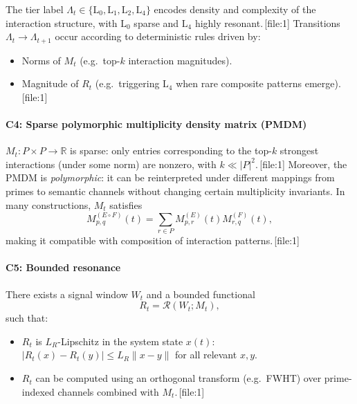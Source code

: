 \documentclass[11pt]{article}
\begin{document}
\begin{description}[leftmargin=1.5em]
\item[C3.] The tier label $\Lambda_t \in \{\mathrm{L}_0, \mathrm{L}_1, \mathrm{L}_2, \mathrm{L}_4\}$ encodes density and complexity of the interaction structure, with $\mathrm{L}_0$ sparse and $\mathrm{L}_4$ highly resonant.\,[file:1]
Transitions $\Lambda_t \to \Lambda_{t+1}$ occur according to deterministic rules driven by:
\begin{itemize}[leftmargin=1.5em]
  \item Norms of $M_t$ (e.g.\ top-$k$ interaction magnitudes).
  \item Magnitude of $R_t$ (e.g.\ triggering $\mathrm{L}_4$ when rare composite patterns emerge).\,[file:1]
\end{itemize}
\end{description}

\paragraph{C4: Sparse polymorphic multiplicity density matrix (PMDM)}

\begin{description}[leftmargin=1.5em]
\item[C4.] $M_t : P \times P \to \mathbb{R}$ is sparse: only entries corresponding to the top-$k$ strongest interactions (under some norm) are nonzero, with $k \ll |P|^2$.\,[file:1]
Moreover, the PMDM is \emph{polymorphic}: it can be reinterpreted under different mappings from primes to semantic channels without changing certain multiplicity invariants.
In many constructions, $M_t$ satisfies
\[
  M^{(E \circ F)}_{p,q}(t) = \sum_{r \in P} M^{(E)}_{p,r}(t) M^{(F)}_{r,q}(t),
\]
making it compatible with composition of interaction patterns.\,[file:1]
\end{description}

\paragraph{C5: Bounded resonance}

\begin{description}[leftmargin=1.5em]
\item[C5.] There exists a signal window $W_t$ and a bounded functional
\[
  R_t = \mathcal{R}(W_t; M_t),
\]
such that:
\begin{itemize}[leftmargin=1.5em]
  \item $R_t$ is $L_R$-Lipschitz in the system state $x(t)$: $|R_t(x) - R_t(y)| \leq L_R \|x - y\|$ for all relevant $x,y$.
  \item $R_t$ can be computed using an orthogonal transform (e.g.\ FWHT) over prime-indexed channels combined with $M_t$.\,[file:1]
\end{itemize}
\end{description}
\end{document}
